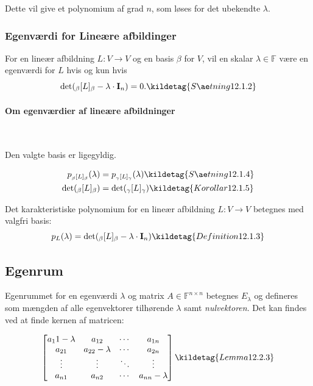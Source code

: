 Dette vil give et polynomium af grad $n$, som løses for det ubekendte $\lambda$.


\subsubsection{Egenværdi for Lineære afbildinger}
For en lineær afbildning $L: V \to V$ og en basis $\beta$ for $V$, vil en skalar $\lambda \in \mathbb{F}$ være en egenværdi for $L$ hvis og kun hvis
\[
\det(_\beta[L]_{\beta} - \lambda \cdot \mathbf{I}_n) = 0.
\kildetag{Sætning 12.1.2}
\]

\paragraph{Om egenværdier af lineære afbildninger}

\

Den valgte basis er ligegyldig.

\begin{align*}
    p_{_\beta[L]_\beta}(\lambda) &= p_{_\gamma[L]_\gamma}(\lambda) \kildetag{Sætning 12.1.4} \\
    \det(_\beta[L]_\beta) &= \det(_\gamma[L]_\gamma) \kildetag{Korollar 12.1.5}
\end{align*}

Det karakteristiske polynomium for en lineær afbildning $L: V \to V$ betegnes med valgfri basis:
\[
p_L(\lambda) = \det(_\beta[L]_\beta - \lambda \cdot \mathbf{I}_n) \kildetag{Definition 12.1.3}
\]

\subsection{Egenrum}

Egenrummet for en egenværdi $\lambda$ og matrix $A \in \mathbb{F}^{n \times n}$ betegnes $E_{\lambda}$ og defineres som mængden af alle egenvektorer tilhørende $\lambda$ samt \emph{nulvektoren}. Det kan findes ved at finde kernen af matricen:

\[ 
\begin{bmatrix}
    a_11 - \lambda & a_{12} & \cdots & a_{1n} \\
    a_{21} & a_{22} - \lambda & \cdots & a_{2n} \\
    \vdots & \vdots & \ddots & \vdots \\
    a_{n1} & a_{n2} & \cdots & a_{nn} - \lambda
\end{bmatrix} \kildetag{Lemma 12.2.3}
\]

